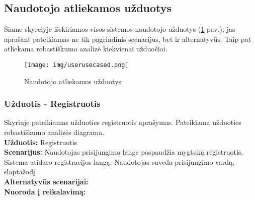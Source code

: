 \documentclass{VUMIFPSkursinis}
\begin{document}
\subsection{Naudotojo atliekamos užduotys}
Šiame skyrelyje išskiriamos visos sistemos naudotojo užduotys (\ref{fig:usercd} pav.), jas aprašant pateikiamas ne tik pagrindinis scenarijus, bet ir alternatyvūs. Taip pat atliekama robastiškumo analizė kiekvienai užduočiai.

\begin{figure}[H]
\centering
\texttt{[image: img/userusecased.png]}
\label{fig:usercd}
\caption{Naudotojo atliekamos užduotys}
\end{figure}

\subsubsection{Užduotis - Registruotis}
Skyriuje pateikiamas užduoties registruotis aprašymas. Pateikiama užduoties robastiškumo analizės diagrama.\\
\textbf{Užduotis:}  Registruotis \\
\textbf{Scenarijus:} Naudotojas prisijungimo lange paspaudžia mygtuką registruotis. Sistema atidaro registracijos langą. Naudotojas suveda prisijungimo vardą, slaptažodį  \\
\textbf{Alternatyvūs scenarijai:} \\
\textbf{Nuoroda į reikalavimą: } 


\newpage

\end{document}

